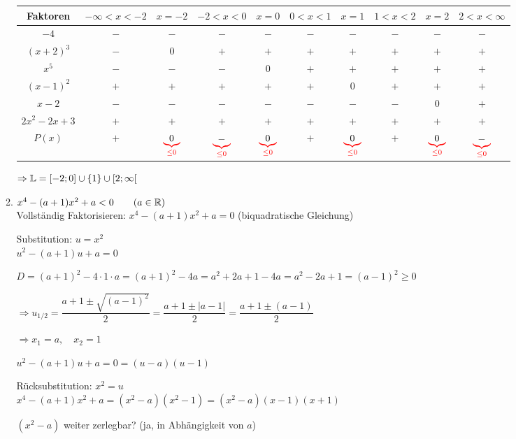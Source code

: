 \begin{enumerate}[A)]
\begin{enumerate}[1.]
		\hspace{-65pt}
		\begin{tabular}{c|c|c|c|c|c|c|c|c|c}
			Faktoren & \parbox{38pt}{$-\infty<x<-2$} & $x=-2$ & \parbox{30pt}{$-2<x<0$} & $x=0$ & \parbox{30pt}{$0<x<1$} & $x=1$ & \parbox{30pt}{$1<x<2$} & $x=2$ & \parbox{35pt}{$2<x<\infty$}\\
			\hline
			$-4$ & $-$ & $-$ & $-$ & $-$ & $-$ & $-$ & $-$ & $-$ & $-$ \\
			$(x + 2)^3$ & $-$ & $0$ & $+$ & $+$ & $+$ & $+$ & $+$ & $+$ & $+$ \\
			$x^5$ & $-$ & $-$ & $-$ & $0$ & $+$ & $+$ & $+$ & $+$ & $+$ \\
			$(x - 1)^2$ & $+$ & $+$ & $+$ & $+$ & $+$ & $0$ & $+$ & $+$ & $+$ \\
			$x - 2$ & $-$ & $-$ & $-$ & $-$ & $-$ & $-$ & $-$ & $0$ & $+$ \\
			$2x^2-2x+3$ & $+$ & $+$ & $+$ & $+$ & $+$ & $+$ & $+$ & $+$ & $+$ \\
			\hline
			$P(x)$ & $+$ & $\textcolor{red}{\underbrace{\textcolor{black}{0}}_{\le0}}$ & $\textcolor{red}{\underbrace{\textcolor{black}{-}}_{\le0}}$ & $\textcolor{red}{\underbrace{\textcolor{black}{0}}_{\le0}}$ & $+$ & $\textcolor{red}{\underbrace{\textcolor{black}{0}}_{\le0}}$ & $+$ & $\textcolor{red}{\underbrace{\textcolor{black}{0}}_{\le0}}$ & $\textcolor{red}{\underbrace{\textcolor{black}{-}}_{\le0}}$ \\
		\end{tabular}
		
		$\Rightarrow \mathbb{L}=[-2;0] \cup \{1\} \cup [2;\infty[$
		
		\clearpage
		\item $x^4-(a+1)x^2+a<0 \qquad(a\in\mathbb{R})$\\
		Vollständig Faktorisieren: $x^4-(a+1)x^2+a=0$ (biquadratische Gleichung)
		
		Substitution: $u=x^2$\\
		$u^2-(a+1)u+a=0$
		
		$D=(a+1)^2-4\cdot1\cdot a=(a+1)^2-4a=a^2+2a+1-4a=a^2-2a+1=(a-1)^2\ge0$
		
		$\Rightarrow u_{1/2}=\dfrac{a+1\pm\sqrt{(a-1)^2}}{2} = \dfrac{a+1\pm|a-1|}{2} = \dfrac{a+1\pm(a-1)}{2}$
		
		$\Rightarrow x_1=a,\quad x_2=1$
		
		$u^2-(a+1)u+a=0 = (u-a)(u-1)$
		
		Rücksubstitution: $x^2=u$\\
		$x^4-(a+1)x^2+a = (x^2-a)(x^2-1)= (x^2-a)(x-1)(x+1)$
		
		$(x^2-a)$ weiter zerlegbar? (ja, in Abhängigkeit von $a$)
		

\end{enumerate}
\end{enumerate}
